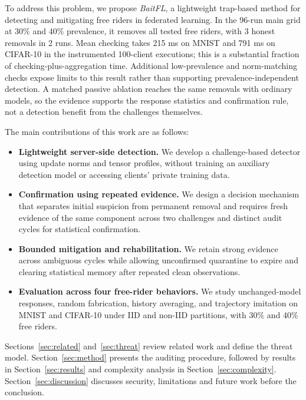 \documentclass[journal]{IEEEtran}
\begin{document}
To address this problem, we propose \emph{BaitFL}, a lightweight trap-based
method for detecting and mitigating free riders in federated learning.
In the 96-run main grid at 30\% and 40\% prevalence,
it removes all tested free riders,
with 3 honest removals in 2 runs. Mean checking takes 215 ms on MNIST and 791 ms on CIFAR-10 in the
instrumented 100-client executions; this is a substantial fraction of
checking-plus-aggregation time.
Additional low-prevalence and norm-matching checks expose limits to this
result rather than supporting prevalence-independent detection.
A matched passive ablation reaches the same removals with ordinary models,
so the evidence supports the response statistics and confirmation rule,
not a detection benefit from the challenges themselves.

\noindent The main contributions of this work are as follows:
\begin{itemize} %
\item \textbf{Lightweight server-side detection.} We develop a challenge-based
detector using update norms and tensor profiles, without training an auxiliary
detection model or accessing clients' private training data.
\item \textbf{Confirmation using repeated evidence.} We design a decision
mechanism that separates initial suspicion from permanent removal and requires
fresh evidence of the same component across two challenges and distinct audit
cycles for statistical confirmation.
\item \textbf{Bounded mitigation and rehabilitation.} We retain strong evidence
across ambiguous cycles while allowing unconfirmed quarantine to expire and
clearing statistical memory after repeated clean observations.
\item \textbf{Evaluation across four free-rider behaviors.} We study unchanged-model
responses, random fabrication, history averaging, and trajectory imitation on
MNIST and CIFAR-10 under IID and non-IID partitions, with 30\% and 40\% free riders.
\end{itemize}

Sections~\ref{sec:related} and~\ref{sec:threat} review related work and
define the threat model. Section~\ref{sec:method} presents the auditing
procedure, followed by results in Section~\ref{sec:results} and complexity
analysis in Section~\ref{sec:complexity}. Section~\ref{sec:discussion}
discusses security, limitations and future work before the conclusion.
\end{document}
